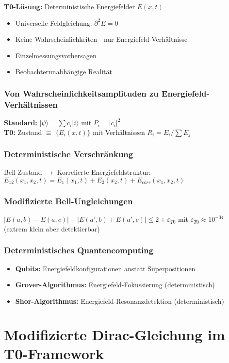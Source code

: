 \documentclass[12pt,a4paper]{report}
\begin{document}
	\textbf{T0-Lösung:} Deterministische Energiefelder $E(x,t)$
	\begin{itemize}
		\item Universelle Feldgleichung: $\partial^2 E = 0$
		\item Keine Wahrscheinlichkeiten - nur Energiefeld-Verhältnisse
		\item Einzelmessungsvorhersagen
		\item Beobachterunabhängige Realität
	\end{itemize}
	
	\subsubsection{Von Wahrscheinlichkeitsamplituden zu Energiefeld-Verhältnissen}
	\textbf{Standard:} $|\psi\rangle = \sum c_i |i\rangle$ mit $P_i = |c_i|^2$\\
	\textbf{T0:} Zustand $\equiv$ $\{E_i(x,t)\}$ mit Verhältnissen $R_i = E_i/\sum E_j$
	
	\subsubsection{Deterministische Verschränkung}
	Bell-Zustand $\rightarrow$ Korrelierte Energiefeldstruktur:
	$E_{12}(x_1,x_2,t) = E_1(x_1,t) + E_2(x_2,t) + E_{corr}(x_1,x_2,t)$
	
	\subsubsection{Modifizierte Bell-Ungleichungen}
	$|E(a,b) - E(a,c)| + |E(a',b) + E(a',c)| \leq 2 + \varepsilon_{T0}$
	mit $\varepsilon_{T0} \approx 10^{-34}$ (extrem klein aber detektierbar)
	
	\subsubsection{Deterministisches Quantencomputing}
	\begin{itemize}
		\item \textbf{Qubits:} Energiefeldkonfigurationen anstatt Superpositionen
		\item \textbf{Grover-Algorithmus:} Energiefeld-Fokussierung (deterministisch)
		\item \textbf{Shor-Algorithmus:} Energiefeld-Resonanzdetektion (deterministisch)
	\end{itemize}
	
	\section{Modifizierte Dirac-Gleichung im T0-Framework}
\end{document}
